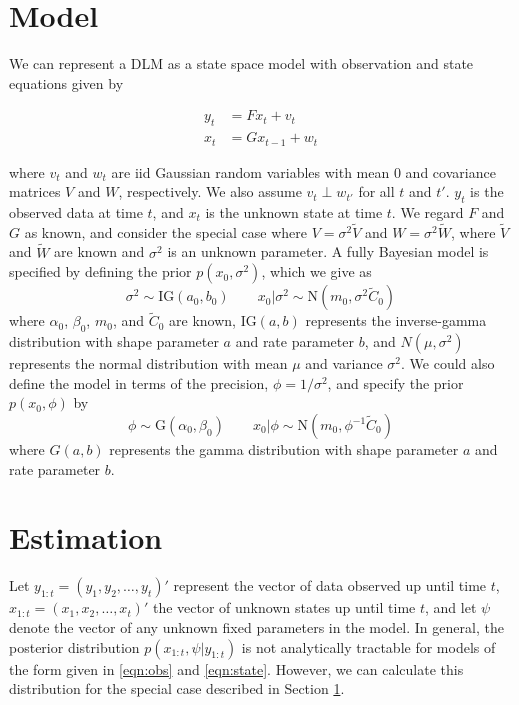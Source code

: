 \documentclass{article}
\begin{document}
\section{Model} \label{sec:model}

We can represent a DLM as a state space model with observation and state equations given by

\begin{align}
y_t &= Fx_t + v_t \label{eqn:obs} \\
x_t &= Gx_{t-1} + w_t \label{eqn:state}
\end{align}

\noindent where $v_t$ and $w_t$ are iid Gaussian random variables with mean 0 and covariance matrices $V$ and $W$, respectively. We also assume $v_t \perp w_{t'}$ for all $t$ and $t'$. $y_t$ is the observed data at time $t$, and $x_t$ is the unknown state at time $t$. We regard $F$ and $G$ as known, and consider the special case where $V = \sigma^2\tilde{V}$ and $W = \sigma^2\tilde{W}$, where $\tilde{V}$ and $\tilde{W}$ are known and $\sigma^2$ is an unknown parameter. A fully Bayesian model is specified by defining the prior $p(x_0,\sigma^2)$, which we give as \[\sigma^2 \sim \mbox{IG}(a_0,b_0) \qquad x_0|\sigma^2 \sim \mbox{N}(m_0,\sigma^2\tilde{C}_0)\]
\noindent where $\alpha_0$, $\beta_0$, $m_0$, and $\tilde{C}_0$ are known, $\mbox{IG}(a,b)$ represents the inverse-gamma distribution with shape parameter $a$ and rate parameter $b$, and $N(\mu,\sigma^2)$ represents the normal distribution with mean $\mu$ and variance $\sigma^2$. We could also define the model in terms of the precision, $\phi = 1 / \sigma^2$, and specify the prior $p(x_0,\phi)$ by \[\phi \sim \mbox{G}(\alpha_0,\beta_0) \qquad x_0|\phi \sim \mbox{N}(m_0,\phi^{-1}\tilde{C}_0)\]
\noindent where $G(a,b)$ represents the gamma distribution with shape parameter $a$ and rate parameter $b$.

\section{Estimation} \label{sec:estimation}

Let $y_{1:t} = (y_1,y_2,\ldots,y_t)'$ represent the vector of data observed up until time $t$, $x_{1:t} = (x_1,x_2,\ldots,x_t)'$ the vector of unknown states up until time $t$, and let $\psi$ denote the vector of any unknown fixed parameters in the model. In general, the posterior distribution $p(x_{1:t},\psi|y_{1:t})$ is not analytically tractable for models of the form given in \eqref{eqn:obs} and \eqref{eqn:state}. However, we can calculate this distribution for the special case described in Section \ref{sec:model}.
\end{document}
